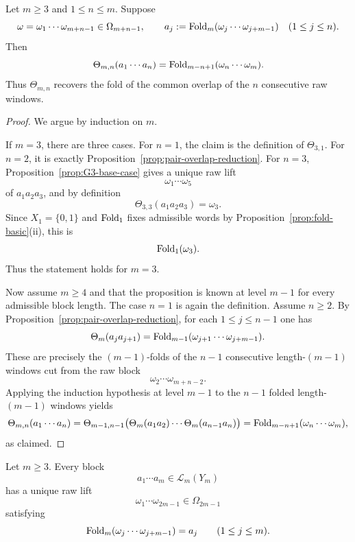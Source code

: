 \begin{proposition}
\label{prop:common-overlap-decoder}
Let $m\ge 3$ and $1\le n\le m$.  Suppose
\[
\omega=\omega_1\cdots\omega_{m+n-1}\in\Omega_{m+n-1},
\qquad
a_j:=\operatorname{Fold}_m(\omega_j\cdots\omega_{j+m-1})
\quad (1\le j\le n).
\]
Then
\[
\Theta_{m,n}(a_1\cdots a_n)
=
\operatorname{Fold}_{m-n+1}(\omega_n\cdots\omega_m).
\]
Thus $\Theta_{m,n}$ recovers the fold of the common overlap of the $n$
consecutive raw windows.
\end{proposition}

\begin{proof}
We argue by induction on $m$.

If $m=3$, there are three cases.  For $n=1$, the claim is the definition of
$\Theta_{3,1}$.  For $n=2$, it is exactly
Proposition~\ref{prop:pair-overlap-reduction}.  For $n=3$,
Proposition~\ref{prop:G3-base-case} gives a unique raw lift
\[
\omega_1\cdots\omega_5
\]
of $a_1a_2a_3$, and by definition
\[
\Theta_{3,3}(a_1a_2a_3)=\omega_3.
\]
Since $X_1=\{0,1\}$ and $\operatorname{Fold}_1$ fixes admissible words by
Proposition~\ref{prop:fold-basic}\textup{(ii)}, this is
\[
\operatorname{Fold}_1(\omega_3).
\]
Thus the statement holds for $m=3$.

Now assume $m\ge 4$ and that the proposition is known at level $m-1$ for every
admissible block length.  The case $n=1$ is again the definition.  Assume
$n\ge 2$.  By Proposition~\ref{prop:pair-overlap-reduction}, for each
$1\le j\le n-1$ one has
\[
\Theta_m(a_ja_{j+1})
=
\operatorname{Fold}_{m-1}(\omega_{j+1}\cdots\omega_{j+m-1}).
\]
These are precisely the $(m-1)$-folds of the $n-1$ consecutive length-$(m-1)$
windows cut from the raw block
\[
\omega_2\cdots\omega_{m+n-2}.
\]
Applying the induction hypothesis at level $m-1$ to the $n-1$ folded
length-$(m-1)$ windows yields
\[
\Theta_{m,n}(a_1\cdots a_n)
=
\Theta_{m-1,n-1}\bigl(
\Theta_m(a_1a_2)\cdots\Theta_m(a_{n-1}a_n)
\bigr)
=
\operatorname{Fold}_{m-n+1}(\omega_n\cdots\omega_m),
\]
as claimed.
\end{proof}

\begin{theorem}
\label{thm:length-m-block-unique-lift}
Let $m\ge 3$.  Every block
\[
a_1\cdots a_m\in\mathcal L_m(Y_m)
\]
has a unique raw lift
\[
\omega_1\cdots\omega_{2m-1}\in\Omega_{2m-1}
\]
satisfying
\[
\operatorname{Fold}_m(\omega_j\cdots\omega_{j+m-1})=a_j
\qquad (1\le j\le m).
\]
\end{theorem}

